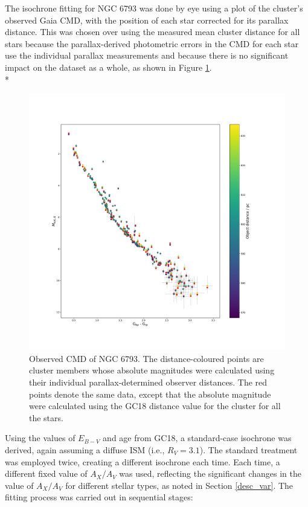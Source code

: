 \documentclass[12pt, a4paper]{report}
\begin{document}
The isochrone fitting for NGC 6793 was done by eye using a plot of the cluster's observed Gaia CMD, with the position of each star corrected for its parallax distance. This was chosen over using the measured mean cluster distance for all stars because the parallax-derived photometric errors in the CMD for each star  use the individual parallax measurements and because there is no significant impact on the dataset as a whole, as shown in Figure \ref{indiv_vs_single_distance_check}.\\*

\begin{figure}[h!]
\begin{center}
\includegraphics[width=1.0\textwidth]{../NGC_6793_CMD_Myr_single_distance_vizier.pdf}
\caption{Observed CMD of NGC 6793. The distance-coloured points are cluster members whose absolute magnitudes were calculated using their individual parallax-determined observer distances. The red points denote the same data, except that the absolute magnitude were calculated using the GC18 distance value for the cluster for all the stars.}
\label{indiv_vs_single_distance_check}
\end{center}
\end{figure}

Using the values of $E_{B-V}$ and age from GC18, a standard-case isochrone was derived, again assuming a diffuse ISM (i.e., $R_{V} = 3.1$). The standard treatment was employed twice, creating a different isochrone each time. Each time, a different fixed value of $A_{X}/A_{V}$ was used, reflecting the significant changes in the value of $A_{X}/A_{V}$ for different stellar types, as noted in Section \ref{desc_var}. The fitting process was carried out in sequential stages:
\end{document}
